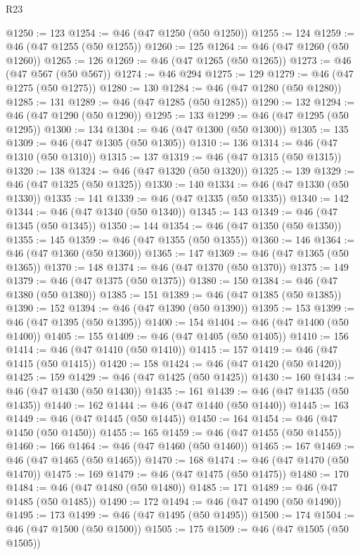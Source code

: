 \begin{lexlean}{R23}
\begin{coremodule}
@1250 := 123
@1254 := @46 (@47 @1250 (@50 @1250))
@1255 := 124
@1259 := @46 (@47 @1255 (@50 @1255))
@1260 := 125
@1264 := @46 (@47 @1260 (@50 @1260))
@1265 := 126
@1269 := @46 (@47 @1265 (@50 @1265))
@1273 := @46 (@47 @567 (@50 @567))
@1274 := @46 @294
@1275 := 129
@1279 := @46 (@47 @1275 (@50 @1275))
@1280 := 130
@1284 := @46 (@47 @1280 (@50 @1280))
@1285 := 131
@1289 := @46 (@47 @1285 (@50 @1285))
@1290 := 132
@1294 := @46 (@47 @1290 (@50 @1290))
@1295 := 133
@1299 := @46 (@47 @1295 (@50 @1295))
@1300 := 134
@1304 := @46 (@47 @1300 (@50 @1300))
@1305 := 135
@1309 := @46 (@47 @1305 (@50 @1305))
@1310 := 136
@1314 := @46 (@47 @1310 (@50 @1310))
@1315 := 137
@1319 := @46 (@47 @1315 (@50 @1315))
@1320 := 138
@1324 := @46 (@47 @1320 (@50 @1320))
@1325 := 139
@1329 := @46 (@47 @1325 (@50 @1325))
@1330 := 140
@1334 := @46 (@47 @1330 (@50 @1330))
@1335 := 141
@1339 := @46 (@47 @1335 (@50 @1335))
@1340 := 142
@1344 := @46 (@47 @1340 (@50 @1340))
@1345 := 143
@1349 := @46 (@47 @1345 (@50 @1345))
@1350 := 144
@1354 := @46 (@47 @1350 (@50 @1350))
@1355 := 145
@1359 := @46 (@47 @1355 (@50 @1355))
@1360 := 146
@1364 := @46 (@47 @1360 (@50 @1360))
@1365 := 147
@1369 := @46 (@47 @1365 (@50 @1365))
@1370 := 148
@1374 := @46 (@47 @1370 (@50 @1370))
@1375 := 149
@1379 := @46 (@47 @1375 (@50 @1375))
@1380 := 150
@1384 := @46 (@47 @1380 (@50 @1380))
@1385 := 151
@1389 := @46 (@47 @1385 (@50 @1385))
@1390 := 152
@1394 := @46 (@47 @1390 (@50 @1390))
@1395 := 153
@1399 := @46 (@47 @1395 (@50 @1395))
@1400 := 154
@1404 := @46 (@47 @1400 (@50 @1400))
@1405 := 155
@1409 := @46 (@47 @1405 (@50 @1405))
@1410 := 156
@1414 := @46 (@47 @1410 (@50 @1410))
@1415 := 157
@1419 := @46 (@47 @1415 (@50 @1415))
@1420 := 158
@1424 := @46 (@47 @1420 (@50 @1420))
@1425 := 159
@1429 := @46 (@47 @1425 (@50 @1425))
@1430 := 160
@1434 := @46 (@47 @1430 (@50 @1430))
@1435 := 161
@1439 := @46 (@47 @1435 (@50 @1435))
@1440 := 162
@1444 := @46 (@47 @1440 (@50 @1440))
@1445 := 163
@1449 := @46 (@47 @1445 (@50 @1445))
@1450 := 164
@1454 := @46 (@47 @1450 (@50 @1450))
@1455 := 165
@1459 := @46 (@47 @1455 (@50 @1455))
@1460 := 166
@1464 := @46 (@47 @1460 (@50 @1460))
@1465 := 167
@1469 := @46 (@47 @1465 (@50 @1465))
@1470 := 168
@1474 := @46 (@47 @1470 (@50 @1470))
@1475 := 169
@1479 := @46 (@47 @1475 (@50 @1475))
@1480 := 170
@1484 := @46 (@47 @1480 (@50 @1480))
@1485 := 171
@1489 := @46 (@47 @1485 (@50 @1485))
@1490 := 172
@1494 := @46 (@47 @1490 (@50 @1490))
@1495 := 173
@1499 := @46 (@47 @1495 (@50 @1495))
@1500 := 174
@1504 := @46 (@47 @1500 (@50 @1500))
@1505 := 175
@1509 := @46 (@47 @1505 (@50 @1505))

\end{coremodule}
\end{lexlean}
